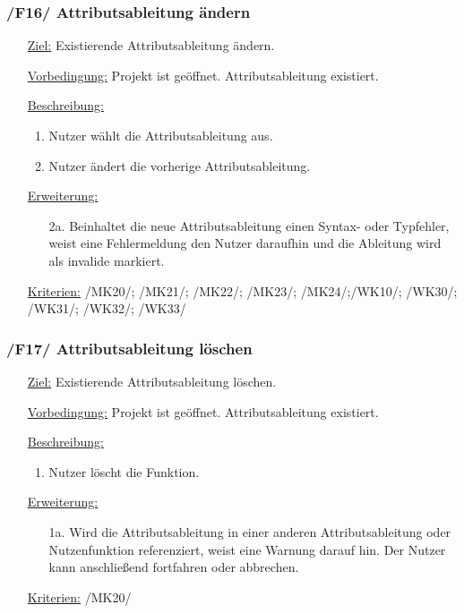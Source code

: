 \documentclass{article}
\begin{document}
\subsubsection*{\textbf{/F16/} Attributsableitung ändern} \label{sec:f:Attributsableitung ändern}
\begin{itemize}
    \item[\underline{Ziel:}] Existierende Attributsableitung ändern.
    \item[\underline{Vorbedingung:}] Projekt ist geöffnet. Attributsableitung existiert.
    \item[\underline{Beschreibung:}]
    \begin{enumerate}
        \item Nutzer wählt die Attributsableitung aus.
        \item Nutzer ändert die vorherige Attributsableitung.
    \end{enumerate}
    \item[\underline{Erweiterung:}]
    \begin{itemize}
        \item[2a.] Beinhaltet die neue Attributsableitung einen Syntax- oder Typfehler, weist eine Fehlermeldung den Nutzer daraufhin und die Ableitung wird als invalide markiert. 
    \end{itemize}
    \item[\underline{Kriterien:}] /MK20/; /MK21/; /MK22/; /MK23/; /MK24/;\newline/WK10/; /WK30/; /WK31/; /WK32/; /WK33/
\end{itemize}

\subsubsection*{\textbf{/F17/} Attributsableitung löschen} \label{sec:f:Attributsableitung löschen}
\begin{itemize}
    \item[\underline{Ziel:}] Existierende Attributsableitung löschen.
    \item[\underline{Vorbedingung:}] Projekt ist geöffnet. Attributsableitung existiert.
    \item[\underline{Beschreibung:}]
    \begin{enumerate}
        \item Nutzer löscht die Funktion.
    \end{enumerate}
    \item[\underline{Erweiterung:}]
    \begin{itemize}
        \item[1a.] Wird die Attributsableitung in einer anderen Attributsableitung oder Nutzenfunktion referenziert, weist eine Warnung darauf hin. Der Nutzer kann anschließend fortfahren oder abbrechen.
    \end{itemize}
    \item[\underline{Kriterien:}] /MK20/
\end{itemize}
\end{document}
